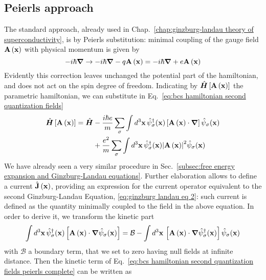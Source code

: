 \subsection{Peierls approach}

The standard approach, already used in Chap.~\ref{chap:ginzburg-landau theory of superconductivity}, is by Peierls substitution: minimal coupling of the gauge field $\mathbf{A}\left({\mathbf{x}}\right)$ with physical momentum is given by
\[
	-i\hbar\grad \to -i\hbar\grad - q \mathbf{A}\left({\mathbf{x}}\right) =  -i\hbar\grad + e \mathbf{A}\left({\mathbf{x}}\right)
\]
Evidently this correction leaves unchanged the potential part of the hamiltonian, and does not act on the spin degree of freedom. Indicating by $\hat{\bm H} \left[{\mathbf{A}\left({\mathbf{x}}\right)}\right]$ the parametric hamiltonian, we can substitute in Eq.~\eqref{eq:bcs hamiltonian second quantization fields}
\begin{equation}\label{eq:bcs hamiltonian second quantization fields peierls complete}
\begin{aligned}
	\hat{\bm H} \left[{\mathbf{A}\left({\mathbf{x}}\right)}\right] = \hat{\bm H} &-
	 \frac{i\hbar e}{m} \sum_\sigma \int d^3 \mathbf{x} \, \hat{\psi}_\sigma^\dagger (\mathbf{x}) \left[{\mathbf{A}\left({\mathbf{x}}\right) \cdot\grad}\right] \hat{\psi}_\sigma (\mathbf{x}) \\
	&+ \frac{e^2}{m} \sum_\sigma \int d^3 \mathbf{x} \, \hat{\psi}_\sigma^\dagger (\mathbf{x}) \abs{\mathbf{A}\left({\mathbf{x}}\right)}^2 \hat{\psi}_\sigma (\mathbf{x})
\end{aligned}
\end{equation}
We have already seen a very similar procedure in Sec.~\ref{subsec:free energy expansion and Ginzburg-Landau equations}. Further elaboration allows to define a current $\hat{\mathbf{J}}\left({\mathbf{x}}\right)$, providing an expression for the current operator equivalent to the second Ginzburg-Landau Equation, \eqref{eq:ginzburg landau eq 2}: such current is defined as the quantity minimally coupled to the field in the above equation. In order to derive it, we transform the kinetic part
\[
	\int d^3 \mathbf{x} \, \hat{\psi}_\sigma^\dagger (\mathbf{x}) \left[{\mathbf{A}\left({\mathbf{x}}\right) \cdot\grad \hat{\psi}_\sigma (\mathbf{x}) \vphantom{\psi^\dagger}}\right] = \mathcal{B} - \int d^3 \mathbf{x} \,  \left[{\mathbf{A}\left({\mathbf{x}}\right) \cdot\grad \hat{\psi}_\sigma^\dagger (\mathbf{x})}\right] \hat{\psi}_\sigma (\mathbf{x})
\]
with $\mathcal{B}$ a boundary term, that we set to zero having null fields at infinite distance. Then the kinetic term of Eq.~\eqref{eq:bcs hamiltonian second quantization fields peierls complete} can be written as
